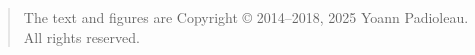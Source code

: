 \begin{quote}
The text and figures are Copyright \copyright{} 2014--2018, 2025 Yoann Padioleau.\\
All rights reserved.
\end{quote}

